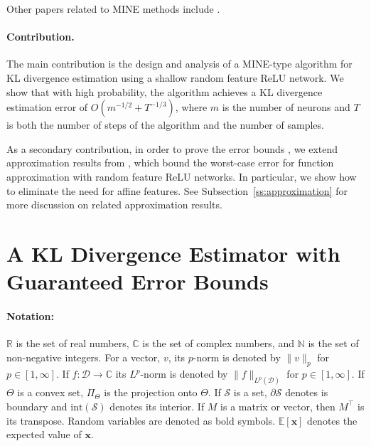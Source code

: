 \documentclass[twoside]{article}
\theoremstyle{definition}
\newcommand{\N}{\mathbb{N}}
\newcommand{\R}{\mathbb{R}}
\newcommand{\E}{\mathbb{E}}
\newcommand{\C}{\mathbb{C}}
\newcommand{\cS}{\mathcal{S}}
\newcommand{\1}[1]{\scalebox{1.25}{$\mathds{1}$}\left[#1\right]}
\begin{document}
Other papers related to MINE methods include \cite{hu2024infonet,mirkarimi2022deep,mirkarimi2023benchmarking,mirkarimi2022neural,tsur2023neural,tsur2024rate,tsur2025neural,lin2019data,choi2022combating,chan2019neural,molavipour2020conditional,molavipour2021neural,molavipour2021neural-conditional}.



\paragraph*{Contribution.}
The main contribution is the design and analysis of a MINE-type algorithm for KL divergence estimation using a shallow random feature ReLU network. We show that with high probability, the algorithm achieves a KL divergence estimation error of $O(m^{-1/2}+T^{-1/3})$, where $m$ is the number of neurons and $T$ is both the number of steps of the algorithm and the number of samples. 

As a secondary contribution, in order to prove the error bounds
, we extend approximation results from \cite{lamperski2024approximation,lamperski2024functiongradientapproximationrandom}, which bound the worst-case error for function approximation with random feature ReLU networks. In particular, we show how to eliminate the  need for  affine features. See Subsection~\ref{ss:approximation} for more discussion on related approximation results.  







\section{A KL Divergence Estimator with Guaranteed Error Bounds}

\paragraph{\bf Notation:}
$\R$ is the set of real numbers, $\C$ is the set of complex numbers, and $\N$ is the set of non-negative integers. 
For a vector, $v$, its $p$-norm is denoted by $\|v\|_p$ for $p\in [1,\infty]$. If $f:\mathcal{D}\to \C$ its $L^p$-norm is denoted by $\|f\|_{L^p(\mathcal{D})}$ for $p\in [1,\infty]$.
If $\Theta$ is a convex set, $\Pi_\Theta$ is the projection onto $\Theta.$ If $\cS$ is a set, $\partial \cS$ denotes is boundary and $\mathrm{int}(\cS)$ denotes its interior.   If $M$ is a matrix or vector, then $M^\top$ is its transpose.  Random variables are denoted as bold symbols. $\E[\bm{x}]$ denotes the expected value of $\bm{x}$. 
\end{document}
